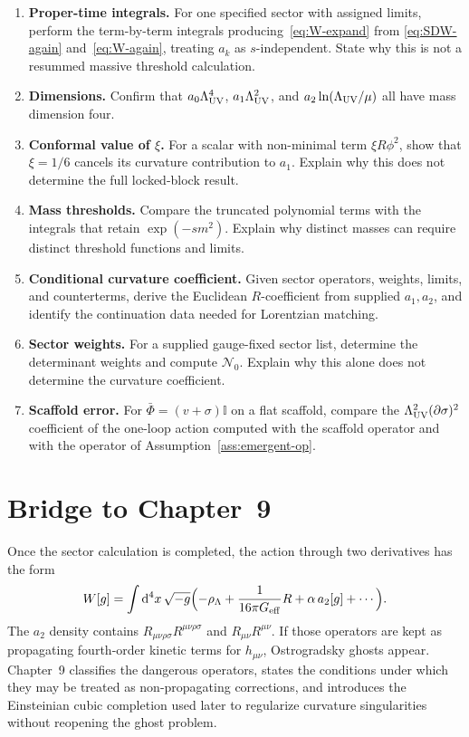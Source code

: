 \begin{enumerate}
  \item \textbf{Proper-time integrals.}
    For one specified sector with assigned limits, perform the
    term-by-term integrals producing~\eqref{eq:W-expand} from
    \eqref{eq:SDW-again} and~\eqref{eq:W-again}, treating \(a_k\)
    as \(s\)-independent. State why this is not a resummed massive
    threshold calculation.
  \item \textbf{Dimensions.}
    Confirm that \(a_0\Lambda_{\mathrm{UV}}^4\), \(a_1\Lambda_{\mathrm{UV}}^2\), and
    \(a_2\ln(\Lambda_{\mathrm{UV}}/\mu)\) all have mass dimension four.
  \item \textbf{Conformal value of \(\xi\).}
    For a scalar with non-minimal term \(\xi R\phi^2\), show that
    \(\xi=1/6\) cancels its curvature contribution to \(a_1\).
    Explain why this does not determine the full locked-block result.
  \item \textbf{Mass thresholds.}
    Compare the truncated polynomial terms with the integrals that
    retain \(\exp(-s m^2)\). Explain why distinct masses can require
    distinct threshold functions and limits.
  \item \textbf{Conditional curvature coefficient.}
    Given sector operators, weights, limits, and counterterms, derive
    the Euclidean \(R\)-coefficient from supplied \(a_1,a_2\), and
    identify the continuation data needed for Lorentzian matching.
  \item \textbf{Sector weights.}
    For a supplied gauge-fixed sector list, determine the determinant
    weights and compute \(\mathcal N_0\). Explain why this alone does
    not determine the curvature coefficient.
  \item \textbf{Scaffold error.}
    For \(\bar\Phi=(v+\sigma)\mathbb{I}\) on a flat scaffold, compare
    the \(\Lambda_{\mathrm{UV}}^2(\partial\sigma)^2\) coefficient of the one-loop
    action computed with the scaffold operator and with the operator
    of Assumption~\ref{ass:emergent-op}.
\end{enumerate}

\section{Bridge to Chapter~9}
\label{sec:ch8-bridge}

Once the sector calculation is completed, the action through two
derivatives has the form
\begin{equation}
  \label{eq:W-through-2}
  W[g]
  =\int\mathrm{d}^4x\,\sqrt{-g}
   \Bigl(
     -\rho_\Lambda
     +\frac{1}{16\pi G_{\mathrm{eff}}}R
     +\alpha\,a_2[g]
     +\cdots
   \Bigr).
\end{equation}
The \(a_2\) density contains \(R_{\mu\nu\rho\sigma}R^{\mu\nu\rho\sigma}\)
and \(R_{\mu\nu}R^{\mu\nu}\). If those operators are kept as
propagating fourth-order kinetic terms for \(h_{\mu\nu}\),
Ostrogradsky ghosts appear. Chapter~9 classifies the dangerous
operators, states the conditions under which they may be treated as
non-propagating corrections, and introduces the Einsteinian cubic
completion used later to regularize curvature singularities without
reopening the ghost problem.